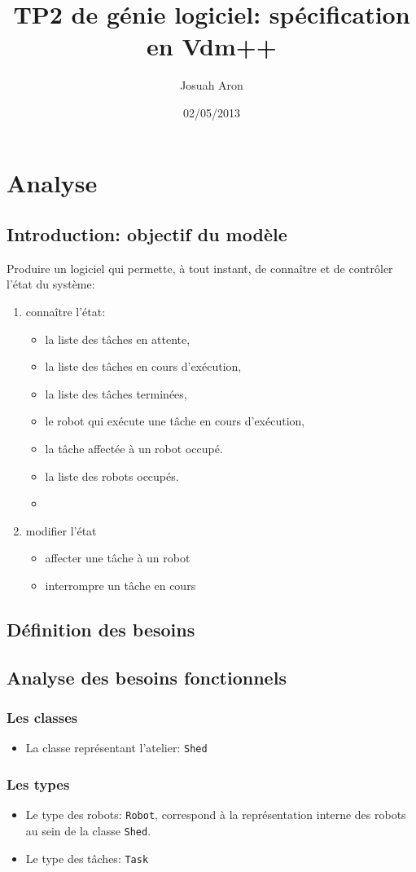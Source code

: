 \documentclass{article}
\author{Josuah Aron}
\date{02/05/2013}
\title{TP2 de génie logiciel: spécification en Vdm++}
\begin{document}
\section{Analyse}
\subsection{Introduction: objectif du modèle}
Produire un logiciel qui permette, à tout instant, de connaître et de contrôler l'état du système:
\begin{enumerate}
\item connaître l'état:
  \begin{itemize}
  \item la liste des tâches en attente,
  \item la liste des tâches en cours d’exécution,
  \item la liste des tâches terminées,
  \item le robot qui exécute une tâche en cours d’exécution,
  \item la tâche affectée à un robot occupé.
  \item la liste des robots occupés.
  \item  \end{itemize}
\item modifier l'état
  \begin{itemize}
  \item affecter une tâche à un robot
  \item interrompre un tâche en cours
  \end{itemize}
\end{enumerate}

\subsection{Définition des besoins}
\subsection{Analyse des besoins fonctionnels}
\subsubsection{Les classes}
\begin{itemize}
\item La classe représentant l'atelier: \texttt{Shed}
\end{itemize}

\subsubsection{Les types}
\begin{itemize}
\item Le type des robots: \texttt{Robot}, correspond à la représentation interne des robots au sein de la classe \texttt{Shed}.
\item Le type des tâches: \texttt{Task}
\end{itemize}
\end{document}
